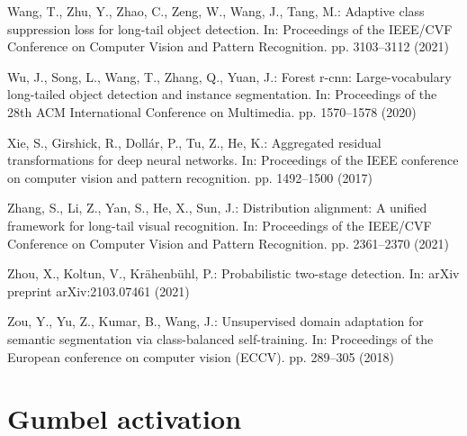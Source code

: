 \documentclass[runningheads]{llncs}
\begin{document}
\begin{thebibliography}{10}
Wang, T., Zhu, Y., Zhao, C., Zeng, W., Wang, J., Tang, M.: Adaptive class
  suppression loss for long-tail object detection. In: Proceedings of the
  IEEE/CVF Conference on Computer Vision and Pattern Recognition. pp.
  3103--3112 (2021)

Wu, J., Song, L., Wang, T., Zhang, Q., Yuan, J.: Forest r-cnn: Large-vocabulary
  long-tailed object detection and instance segmentation. In: Proceedings of
  the 28th ACM International Conference on Multimedia. pp. 1570--1578 (2020)

Xie, S., Girshick, R., Doll{\'a}r, P., Tu, Z., He, K.: Aggregated residual
  transformations for deep neural networks. In: Proceedings of the IEEE
  conference on computer vision and pattern recognition. pp. 1492--1500 (2017)

Zhang, S., Li, Z., Yan, S., He, X., Sun, J.: Distribution alignment: A unified
  framework for long-tail visual recognition. In: Proceedings of the IEEE/CVF
  Conference on Computer Vision and Pattern Recognition. pp. 2361--2370 (2021)

Zhou, X., Koltun, V., Kr{\"a}henb{\"u}hl, P.: Probabilistic two-stage
  detection. In: arXiv preprint arXiv:2103.07461 (2021)

Zou, Y., Yu, Z., Kumar, B., Wang, J.: Unsupervised domain adaptation for
  semantic segmentation via class-balanced self-training. In: Proceedings of
  the European conference on computer vision (ECCV). pp. 289--305 (2018)

\end{thebibliography}
\clearpage
\appendix


\section{Gumbel activation}
\label{gumbel_details}
\end{document}
